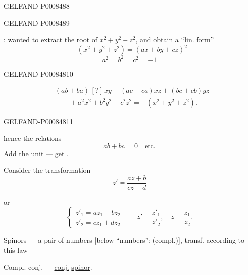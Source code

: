 \begin{GelfandAdjacentEvidence}{GELFAND-P000848}{8}

\end{GelfandAdjacentEvidence}
\begin{GelfandAdjacentEvidence}{GELFAND-P000848}{9}


: wanted to extract the root of \(x^2+y^2+z^2\), and obtain a “lin. form”
\[
-(x^2+y^2+z^2)=(ax+by+cz)^2
\]
\[
a^2=b^2=c^2=-1
\]
\end{GelfandAdjacentEvidence}
\begin{GelfandAdjacentEvidence}{GELFAND-P000848}{10}

\[
\begin{aligned}
&(ab+ba)\,[?]\,xy+(ac+ca)xz+(bc+cb)yz\\
&\qquad{}+a^2x^2+b^2y^2+c^2z^2=-(x^2+y^2+z^2).
\end{aligned}
\]
\end{GelfandAdjacentEvidence}
\begin{GelfandAdjacentEvidence}{GELFAND-P000848}{11}


hence the relations
\[
ab+ba=0 \quad \text{etc.}
\]
Add the unit — get .

Consider the transformation
\[
z'=\frac{az+b}{cz+d}
\]

or
\[
\begin{cases}
z'_1=az_1+bz_2\\
z'_2=cz_1+dz_2
\end{cases}
\qquad z'=\frac{z'_1}{z'_2},\quad z=\frac{z_1}{z_2}.
\]

Spinors — a pair of numbers [below “numbers”: (compl.)], transf. according to this law

Compl. conj. — \uline{conj.} \uline{spinor}.
\end{GelfandAdjacentEvidence}
